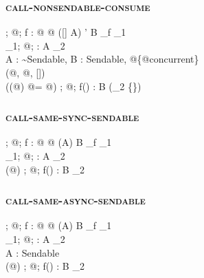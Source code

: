 \subsubsection{\textsc{call-nonsendable-consume}}

  {\Gamma;\; @\kappa;\; \alpha \vdash f : @\sigma\; @\iota\; ([\sending]\; A)\; \alpha' \to B \at \rho_f \dashv \Gamma_1 \\
   \Gamma_1;\; @\kappa;\; \alpha \vdash {} : A \at \disconnected \dashv \Gamma_2 \\
   A : {\sim}\textsf{Sendable},\; B : \textsf{Sendable},\; @\iota \notin \{@\textsf{concurrent}\} \\
   \canSend(@\kappa, @\iota, [\sending]) \\
   \neg(\isActorIsolated(@\kappa) \land @\kappa = @\iota)}
  {\Gamma;\; @\kappa;\; \alpha {}\; f() : B \at \mathunderscore \dashv (\Gamma_2 \setminus \{\})}

\subsubsection{\textsc{call-same-sync-sendable}}

  {\Gamma;\; @\kappa;\; \alpha \vdash f : @\sigma\; @\kappa\; (A) \to B \at \rho_f \dashv \Gamma_1 \\
   \Gamma_1;\; @\kappa;\; \alpha \vdash {} : A \at \mathunderscore \dashv \Gamma_2 \\
   \rho \in \Accessible(@\kappa)}
  {\Gamma;\; @\kappa;\; \alpha \vdash f() : B \at \rho \dashv \Gamma_2}

\subsubsection{\textsc{call-same-async-sendable}}

  {\Gamma;\; @\kappa;\;  \vdash f : @\sigma\; @\kappa\; (A)\;  \to B \at \rho_f \dashv \Gamma_1 \\
   \Gamma_1;\; @\kappa;\;  \vdash {} : A \at \mathunderscore \dashv \Gamma_2 \\
   A : \textsf{Sendable} \\
   \rho \in \Accessible(@\kappa)}
  {\Gamma;\; @\kappa;\;  \vdash {}\; f() : B \at \rho \dashv \Gamma_2}


